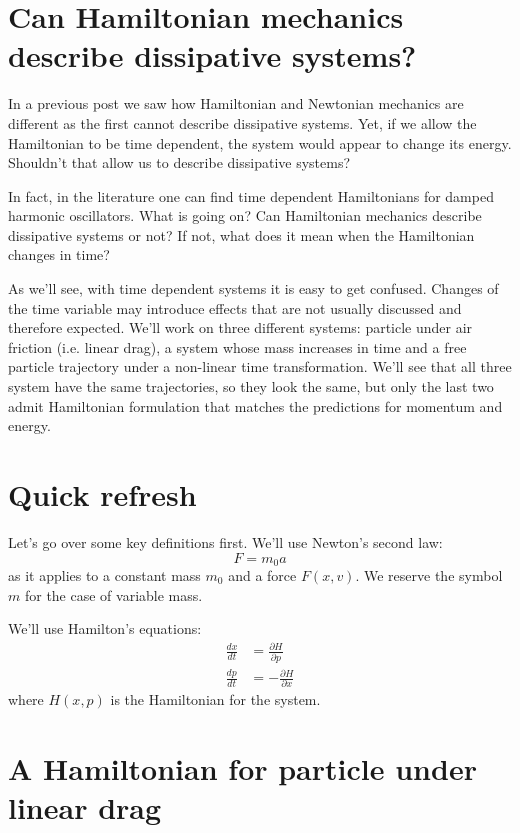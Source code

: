 \documentclass[aps,pra,10pt,twocolumn,floatfix,nofootinbib]{revtex4-1}
\theoremstyle{definition}
\begin{document}
	
\section{Can Hamiltonian mechanics describe dissipative systems?}

In a previous post we saw how Hamiltonian and Newtonian mechanics are different as the first cannot describe dissipative systems. Yet, if we allow the Hamiltonian to be time dependent, the system would appear to change its energy. Shouldn't that allow us to describe dissipative systems?

In fact, in the literature one can find time dependent Hamiltonians for damped harmonic oscillators. What is going on? Can Hamiltonian mechanics describe dissipative systems or not? If not, what does it mean when the Hamiltonian changes in time?

As we'll see, with time dependent systems it is easy to get confused. Changes of the time variable may introduce effects that are not usually discussed and therefore expected. We'll work on three different systems: particle under air friction (i.e. linear drag), a system whose mass increases in time and a free particle trajectory under a non-linear time transformation. We'll see that all three system have the same trajectories, so they look the same, but only the last two admit Hamiltonian formulation that matches the predictions for momentum and energy.

\section{Quick refresh}

Let's go over some key definitions first. We'll use Newton's second law:
\begin{equation}
\label{Fm_0a}
F=m_0a
\end{equation}
as it applies to a constant mass $m_0$ and a force $F(x,v)$. We reserve the symbol $m$ for the case of variable mass.

We'll use Hamilton's equations:
\begin{equation}
\begin{aligned}
\frac{dx}{dt} &= \frac{\partial H}{\partial p} \\
\frac{dp}{dt} &= - \frac{\partial H}{\partial x}
\end{aligned}
\label{Hamilton}
\end{equation}
where $H(x,p)$ is the Hamiltonian for the system.

\section{A Hamiltonian for particle under linear drag}
\end{document}
